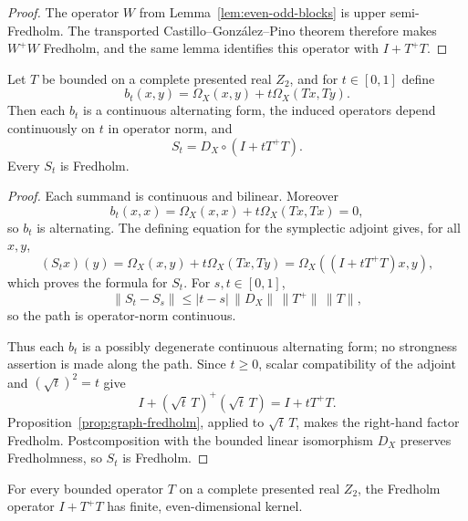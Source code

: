\begin{proof}
The operator $W$ from Lemma~\ref{lem:even-odd-blocks} is upper semi-Fredholm.  The transported
Castillo--Gonz\'alez--Pino theorem therefore makes $W^+W$ Fredholm, and the same lemma identifies
this operator with $I+T^+T$.
\end{proof}

\begin{lemma}\label{lem:kp-alternating-path}
Let $T$ be bounded on a complete presented real $Z_2$, and for $t\in[0,1]$ define
\[
  b_t(x,y)=\Omega_X(x,y)+t\Omega_X(Tx,Ty).
\]
Then each $b_t$ is a continuous alternating form, the induced operators depend continuously on $t$
in operator norm, and
\[
  S_t=D_X\circ(I+tT^+T).
\]
Every $S_t$ is Fredholm.
\leanok
\end{lemma}

\begin{proof}
Each summand is continuous and bilinear.  Moreover
\[
  b_t(x,x)=\Omega_X(x,x)+t\Omega_X(Tx,Tx)=0,
\]
so $b_t$ is alternating.  The defining equation for the symplectic adjoint gives, for all $x,y$,
\[
  (S_tx)(y)=\Omega_X(x,y)+t\Omega_X(Tx,Ty)
  =\Omega_X((I+tT^+T)x,y),
\]
which proves the formula for $S_t$.  For $s,t\in[0,1]$,
\[
  \|S_t-S_s\|\leq |t-s|\,\|D_X\|\,\|T^+\|\,\|T\|,
\]
so the path is operator-norm continuous.

Thus each $b_t$ is a possibly degenerate continuous alternating form; no strongness assertion is
made along the path.  Since $t\geq0$, scalar compatibility of the adjoint and $(\sqrt t)^2=t$ give
\[
  I+(\sqrt t\,T)^+(\sqrt t\,T)=I+tT^+T.
\]
Proposition~\ref{prop:graph-fredholm}, applied to $\sqrt t\,T$, makes the right-hand factor
Fredholm.  Postcomposition with the bounded linear isomorphism $D_X$ preserves Fredholmness, so
$S_t$ is Fredholm.
\end{proof}

\begin{proposition}\label{prop:even-kernel}
For every bounded operator $T$ on a complete presented real $Z_2$, the Fredholm operator
$I+T^+T$ has finite, even-dimensional kernel.
\leanok
\end{proposition}

